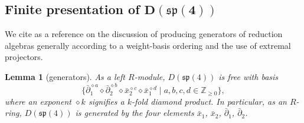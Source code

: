 \documentclass[pdftex]{sigma}
\numberwithin{equation}{section}
\newtheorem{Lemma}[Theorem]{Lemma}
\begin{document}
\subsection[Finite presentation of D(sp(4))]{Finite presentation of $\boldsymbol{D(\mathfrak{sp}(4))}$}\label{subsec:PresentationDRAsp4}
\label{sec:presentation}

We cite \cite{khoroshkinDiagonalReductionAlgebras2010} as a reference on the discussion of producing generators of reduction algebras generally according to a weight-basis ordering and the use of extremal projectors.

\begin{Lemma}[generators]\label{lemma:finite-generators}
	As a left $R$-module, $D(\mathfrak{sp}(4))$ is free with basis
	\[
		\bigl\{
		\bar \partial_1^{\diamond a} \diamond
		\bar \partial_2^{\diamond b} \diamond
		\bar x_2^{\diamond c} \diamond
		\bar x_1^{\diamond d}
		\mid a,b,c,d\in\mathbb{Z}_{\geq 0}\bigr\},
	\]
	where an exponent $\diamond k$ signifies a $k$-fold diamond product.
	In particular, as an $R$-ring, $D(\mathfrak{sp}(4))$ is generated by the four elements $\bar{x}_{1}$, $\bar{x}_{2}$, $\bar{\partial}_{1}$, $\bar{\partial}_{2}$.
\end{Lemma}
\end{document}
